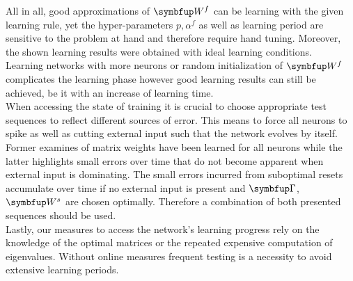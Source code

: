 
All in all, good approximations of $\bmu{W}^f$ can be learning with the given learning rule, yet the hyper-parameters $p,\alpha^f$ as well as learning period are sensitive to the problem at hand and therefore require hand tuning. Moreover, the shown learning results were obtained with ideal learning conditions.\\
Learning networks with more neurons or random initialization of $\bmu{W}^f$ complicates the learning phase however good learning results can still be achieved, be it with an increase of learning time.\\
When accessing the state of training it is crucial to choose appropriate test sequences to reflect different sources of error. This means to force all neurons to spike as well as cutting external input such that the network evolves by itself. Former examines of matrix weights have been learned for all neurons while the latter highlights small errors over time that do not become apparent when external input is dominating. The small errors incurred from suboptimal resets accumulate over time if no external input is present and $\bmu{\Gamma} $, $\bmu{W}^s$ are chosen optimally. Therefore a combination of both presented sequences should be used.\\
Lastly, our measures to access the network's learning progress rely on the knowledge of the optimal matrices or the repeated expensive computation of eigenvalues. Without online measures frequent testing is a necessity to avoid extensive learning periods.\\
